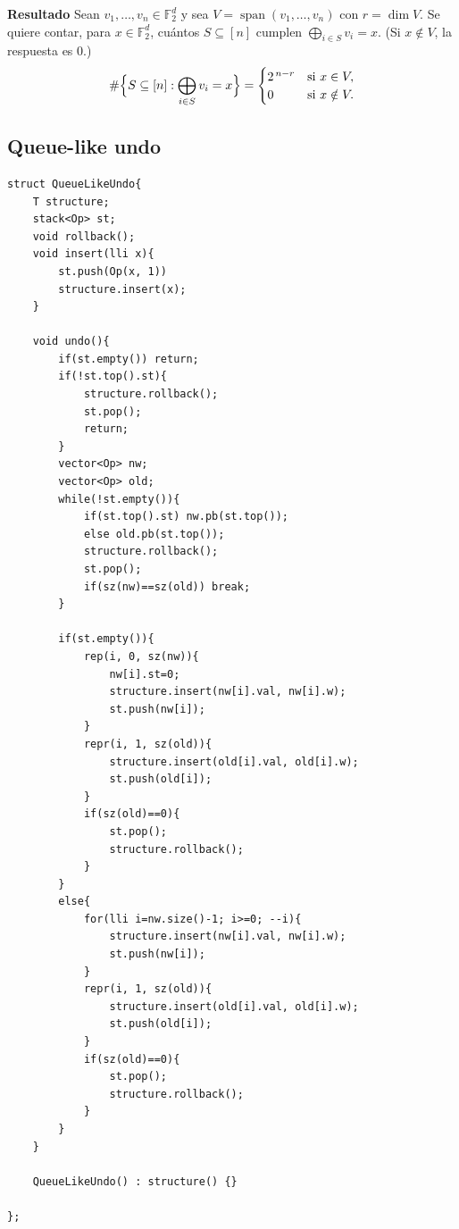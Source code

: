 \textbf{Resultado}
Sean $v_1,\dots,v_n\in\mathbb F_2^d$ y sea $V=\operatorname{span}(v_1,\dots,v_n)$
con $r=\dim V$. Se quiere contar, para $x\in\mathbb F_2^d$, cuántos
$S\subseteq[n]$ cumplen $\bigoplus_{i\in S}v_i=x$. (Si $x\notin V$, la respuesta es 0.)
\[
\#\Bigl\{S\subseteq[n] : \bigoplus_{i\in S}v_i=x\Bigr\}=
\begin{cases}
2^{\,n-r} & \text{si } x\in V,\\
0 & \text{si } x\notin V.
\end{cases}
\]


\subsection{Queue-like undo}
\begin{verbatim}
struct QueueLikeUndo{
    T structure;
    stack<Op> st;
    void rollback();
    void insert(lli x){
        st.push(Op(x, 1))
        structure.insert(x);
    }

    void undo(){
        if(st.empty()) return;
        if(!st.top().st){
            structure.rollback();
            st.pop();
            return;
        }
        vector<Op> nw;
        vector<Op> old;
        while(!st.empty()){
            if(st.top().st) nw.pb(st.top());
            else old.pb(st.top());
            structure.rollback();
            st.pop();
            if(sz(nw)==sz(old)) break;
        }

        if(st.empty()){
            rep(i, 0, sz(nw)){
                nw[i].st=0;
                structure.insert(nw[i].val, nw[i].w);
                st.push(nw[i]);
            }
            repr(i, 1, sz(old)){
                structure.insert(old[i].val, old[i].w);
                st.push(old[i]);
            }
            if(sz(old)==0){
                st.pop();
                structure.rollback();
            }
        }
        else{
            for(lli i=nw.size()-1; i>=0; --i){
                structure.insert(nw[i].val, nw[i].w);
                st.push(nw[i]);
            }
            repr(i, 1, sz(old)){
                structure.insert(old[i].val, old[i].w);
                st.push(old[i]);
            }
            if(sz(old)==0){
                st.pop();
                structure.rollback();
            }
        }
    }

    QueueLikeUndo() : structure() {}

};
\end{verbatim}